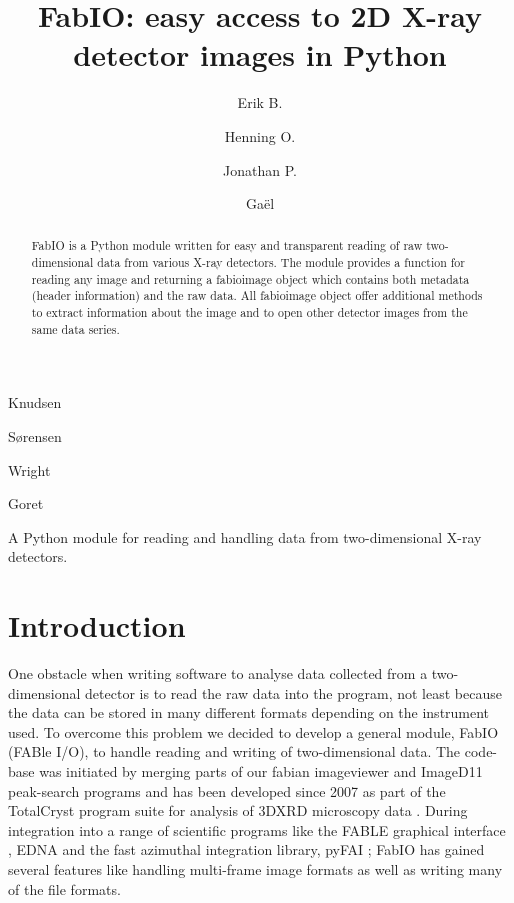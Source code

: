 \documentclass[preprint]{iucr}
\begin{document}
\title{FabIO: easy access to 2D X-ray detector images in Python}

    \author[a]{Erik B.}{Knudsen}
    \author[b]{Henning O.}{S{\o}rensen}
    \author[c]{Jonathan P.}{Wright}
    \author[c]{Ga\"el}{Goret}

\maketitle

\begin{synopsis}
A Python module for reading and handling data from two-dimensional X-ray detectors.
\end{synopsis}

\begin{abstract}
FabIO is a Python module written for easy and transparent reading 
of raw two-dimensional data from various X-ray detectors. The module provides a
function for reading any image and returning a fabioimage object which 
contains both metadata (header information) and the raw data.
All fabioimage object offer additional methods to extract
information about the image and to open other detector images from
the same data series.
 
\end{abstract}

\section{Introduction}

One obstacle when writing software to analyse data collected from a
two-dimensional detector is to read the raw data into the program,
not least because the data can be stored in many different formats
depending on the instrument used.
To overcome this problem we decided to develop a general module,
FabIO (FABle I/O), to handle reading and writing of two-dimensional
data.
The code-base was initiated by merging parts of our fabian imageviewer
\cite{fabian} and ImageD11 \cite{imaged11} peak-search programs and has
been developed since 2007 as part of the TotalCryst \cite{totalcryst}
program suite for analysis of 3DXRD microscopy data \cite{3dxrd}.
During integration into a range of scientific programs like the FABLE graphical
interface \cite{fable}, EDNA \cite{edna} and
the fast azimuthal integration library, pyFAI \cite{pyfai}; FabIO has gained
several features like handling multi-frame image formats as well as
writing many of the file formats.
\end{document}
